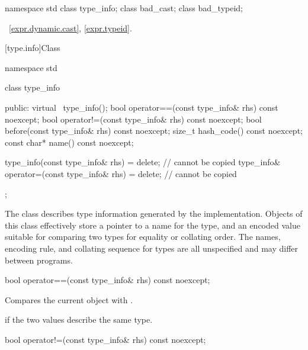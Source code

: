 %
%

%
%
%
\begin{codeblock}
namespace std {
  class type_info;
  class bad_cast;
  class bad_typeid;
}
\end{codeblock}

\xref~\ref{expr.dynamic.cast}, \ref{expr.typeid}.

[type.info]{Class }

%
\begin{codeblock}
namespace std {
  class type_info {
  public:
    virtual ~type_info();
    bool operator==(const type_info& rhs) const noexcept;
    bool operator!=(const type_info& rhs) const noexcept;
    bool before(const type_info& rhs) const noexcept;
    size_t hash_code() const noexcept;
    const char* name() const noexcept;

    type_info(const type_info& rhs) = delete;            // cannot be copied
    type_info& operator=(const type_info& rhs) = delete; // cannot be copied
  };
}
\end{codeblock}

\pnum
The class
describes type information generated by the implementation.
Objects of this class effectively store a pointer to a name for the type, and
an encoded value suitable for comparing two types for equality or collating order.
The names, encoding rule, and collating sequence for types are all unspecified
%
and may differ between programs.

%
\begin{itemdecl}
bool operator==(const type_info& rhs) const noexcept;
\end{itemdecl}

\begin{itemdescr}
\pnum
\effects
Compares the current object with .

\pnum
\returns
{}
if the two values describe the same type.
\end{itemdescr}

%
\begin{itemdecl}
bool operator!=(const type_info& rhs) const noexcept;
\end{itemdecl}


